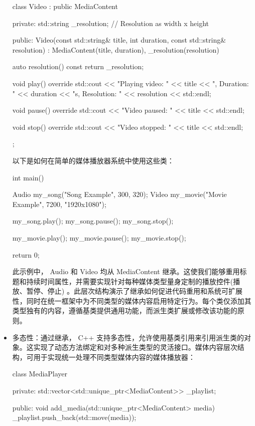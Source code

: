 \begin{itemize}
\begin{cpp}
class Video : public MediaContent {
private:
    std::string _resolution; // Resolution as width x height

public:
    Video(const std::string& title, int duration, const
    std::string& resolution)
        : MediaContent(title, duration), _resolution(resolution)
    {}

    auto resolution() const { return _resolution; }

    void play() override {
        std::cout << "Playing video: " << title << ", Duration: " << duration << "s, Resolution: " << resolution << std::endl;
    }

    void pause() override {
        std::cout << "Video paused: " << title << std::endl;
    }

    void stop() override {
        std::cout << "Video stopped: " << title << std::endl;
    }
};
\end{cpp}

以下是如何在简单的媒体播放器系统中使用这些类：

\begin{cpp}
int main() {
    Audio my_song("Song Example", 300, 320);
    Video my_movie("Movie Example", 7200, "1920x1080");

    my_song.play();
    my_song.pause();
    my_song.stop();

    my_movie.play();
    my_movie.pause();
    my_movie.stop();

    return 0;
}
\end{cpp}

此示例中， Audio 和 Video 均从 MediaContent 继承。这使我们能够重用标题和持续时间属性，并需要实现针对每种媒体类型量身定制的播放控件(播放、暂停、停止) 。此层次结构演示了继承如何促进代码重用和系统可扩展性，同时在统一框架中为不同类型的媒体内容启用特定行为。每个类仅添加其类型独有的内容，遵循基类提供通用功能，而派生类扩展或修改该功能的原则。

\item
多态性：通过继承， C++ 支持多态性，允许使用基类引用来引用派生类的对象。这实现了动态方法绑定和对多种派生类型的灵活接口。媒体内容层次结构，可用于实现统一处理不同类型媒体内容的媒体播放器：

\begin{cpp}
class MediaPlayer {
private:
    std::vector<std::unique_ptr<MediaContent>> _playlist;

public:
    void add_media(std::unique_ptr<MediaContent> media) {
        _playlist.push_back(std::move(media));
    }

}
\end{cpp}
\end{itemize}
